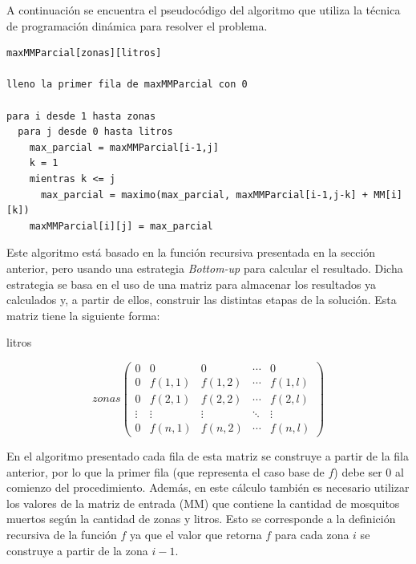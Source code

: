\documentclass[a4paper,11pt] {article}
\begin{document}
A continuaci\'on se encuentra el pseudoc\'odigo del algoritmo que utiliza la t\'ecnica de programaci\'on din\'amica para resolver el problema.

\begin{verbatim}
maxMMParcial[zonas][litros]

lleno la primer fila de maxMMParcial con 0

para i desde 1 hasta zonas
  para j desde 0 hasta litros
    max_parcial = maxMMParcial[i-1,j]
    k = 1
    mientras k <= j
      max_parcial = maximo(max_parcial, maxMMParcial[i-1,j-k] + MM[i][k])
    maxMMParcial[i][j] = max_parcial

\end{verbatim}

% 


Este algoritmo est\'a basado en la funci\'on recursiva presentada en la secci\'on anterior, pero usando una estrategia \textit{Bottom-up} para calcular el resultado. Dicha estrategia se basa en el uso de una matriz para almacenar los resultados ya calculados y, a partir de ellos, construir las distintas etapas de la soluci\'on. Esta matriz tiene la siguiente forma:

\begin{center}
litros
\end{center}
\[ zonas \left( \begin{array}{ccccc}
0 & 0 & 0 & \cdots & 0 \\
0 & f(1,1) & f(1,2) & \cdots & f(1,l)  \\
0 & f(2,1) & f(2,2) & \cdots & f(2,l)	\\
\vdots & \vdots & \vdots & \ddots & \vdots \\
0 & f(n,1) & f(n,2) & \cdots & f(n,l) \end{array} \right)\]

En el algoritmo presentado cada fila de esta matriz se construye a partir de la fila anterior, por lo que la primer fila (que representa el caso base de $f$) debe ser 0 al comienzo del procedimiento. Adem\'as, en este c\'alculo tambi\'en es necesario utilizar los valores de la matriz de entrada (MM) que contiene la cantidad de mosquitos muertos seg\'un la cantidad de zonas y litros.
Esto se corresponde a la definici\'on recursiva de la funci\'on $f$ ya que el valor que retorna $f$ para cada zona $i$ se construye a partir de la zona $i-1$. 
\end{document}
